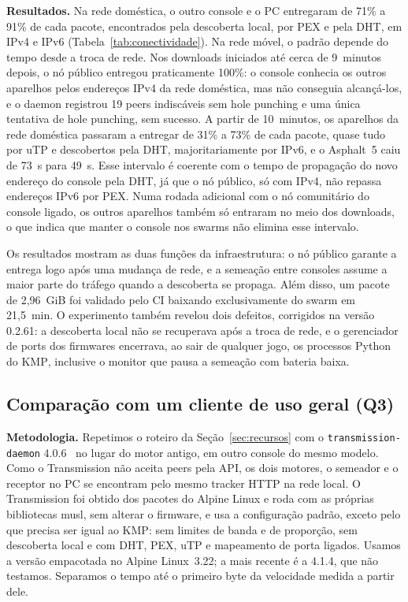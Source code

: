 \documentclass[12pt]{article}
\newcommand{\kmp}{\textsc{KMP}}
\begin{document}
\textbf{Resultados.} Na rede doméstica, o outro console e o PC entregaram de
71\% a 91\% de cada pacote, encontrados pela descoberta local, por PEX e pela
DHT, em IPv4 e IPv6 (Tabela~\ref{tab:conectividade}). Na rede móvel, o padrão
depende do tempo desde a troca de rede. Nos downloads iniciados até cerca de
9~minutos depois, o nó público entregou praticamente 100\%: o console conhecia
os outros aparelhos pelos endereços IPv4 da rede doméstica, mas não conseguia
alcançá-los, e o daemon registrou 19 peers indiscáveis sem hole punching e uma
única tentativa de hole punching, sem sucesso. A partir de 10~minutos, os
aparelhos da rede doméstica passaram a entregar de 31\% a 73\% de cada pacote,
quase tudo por uTP e descobertos pela DHT, majoritariamente por IPv6, e o
Asphalt~5 caiu de 73~s para 49~s. Esse intervalo é coerente com o tempo de
propagação do novo endereço do console pela DHT, já que o nó público, só com
IPv4, não repassa endereços IPv6 por PEX. Numa rodada adicional com o nó
comunitário do console ligado, os outros aparelhos também só entraram no meio
dos downloads, o que indica que manter o console nos swarms não elimina esse
intervalo.

Os resultados mostram as duas funções da infraestrutura: o nó público garante a
entrega logo após uma mudança de rede, e a semeação entre consoles assume a
maior parte do tráfego quando a descoberta se propaga. Além disso, um pacote de
2,96~GiB foi validado pelo CI baixando exclusivamente do swarm em 21,5~min. O
experimento também revelou dois defeitos, corrigidos na versão 0.2.61: a
descoberta local não se recuperava após a troca de rede, e o gerenciador de
ports dos firmwares encerrava, ao sair de qualquer jogo, os processos Python do
\kmp{}, inclusive o monitor que pausa a semeação com bateria baixa.

\subsection{Comparação com um cliente de uso geral (Q3)}

\textbf{Metodologia.} Repetimos o roteiro da Seção~\ref{sec:recursos} com o
\texttt{transmission-daemon} 4.0.6~\cite{transmission} no lugar do motor
antigo, em outro console do mesmo modelo. Como o Transmission não aceita
peers pela API, os dois motores, o semeador e o receptor no PC se encontram
pelo mesmo tracker HTTP na rede local. O Transmission foi obtido dos pacotes
do Alpine Linux e roda com as próprias bibliotecas musl, sem alterar o
firmware, e usa a configuração padrão, exceto pelo que precisa ser igual ao
\kmp{}: sem limites de banda e de proporção, sem descoberta local e com DHT,
PEX, uTP e mapeamento de porta ligados. Usamos a versão empacotada no Alpine
Linux~3.22; a mais recente é a 4.1.4, que não testamos. Separamos o tempo até o
primeiro byte da velocidade medida a partir dele.
\end{document}
